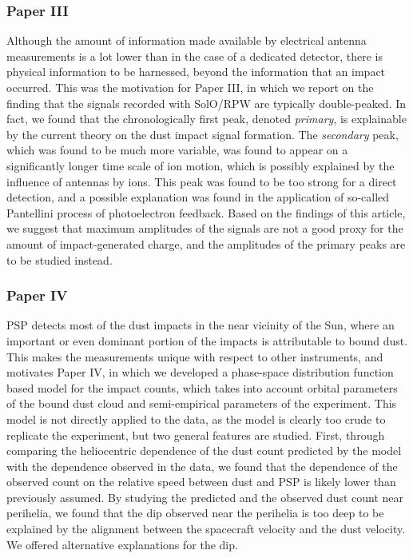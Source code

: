 \subsubsection{Paper III}

Although the amount of information made available by electrical antenna measurements is a lot lower than in the case of a dedicated detector, there is physical information to be harnessed, beyond the information that an impact occurred. This was the motivation for Paper III, in which we report on the finding that the signals recorded with SolO/RPW are typically double-peaked. In fact, we found that the chronologically first peak, denoted \textit{primary}, is explainable by the current theory on the dust impact signal formation. The \textit{secondary} peak, which was found to be much more variable, was found to appear on a significantly longer time scale of ion motion, which is possibly explained by the influence of antennas by ions. This peak was found to be too strong for a direct detection, and a possible explanation was found in the application of so-called Pantellini process of photoelectron feedback. Based on the findings of this article, we suggest that maximum amplitudes of the signals are not a good proxy for the amount of impact-generated charge, and the amplitudes of the primary peaks are to be studied instead.

\subsubsection{Paper IV}

PSP detects most of the dust impacts in the near vicinity of the Sun, where an important or even dominant portion of the impacts is attributable to bound dust. This makes the measurements unique with respect to other instruments, and motivates Paper IV, in which we developed a phase-space distribution function based model for the impact counts, which takes into account orbital parameters of the bound dust cloud and semi-empirical parameters of the experiment. This model is not directly applied to the data, as the model is clearly too crude to replicate the experiment, but two general features are studied. First, through comparing the heliocentric dependence of the dust count predicted by the model with the dependence observed in the data, we found that the dependence of the observed count on the relative speed between dust and PSP is likely lower than previously assumed. By studying the predicted and the observed dust count near perihelia, we found that the dip observed near the perihelia is too deep to be explained by the alignment between the spacecraft velocity and the dust velocity. We offered alternative explanations for the dip. 